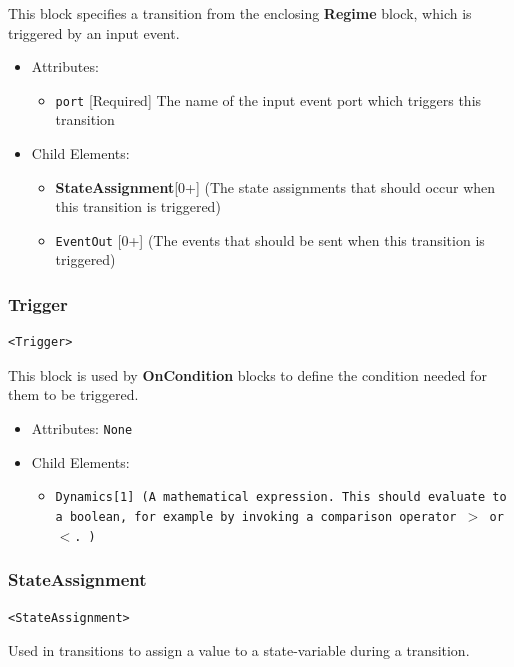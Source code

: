 \documentclass{article}
\newcommand{\MathInline}{\tt{Dynamics}}
\newcommand{\StateAssignment}{{\bf{StateAssignment}}\xspace}
\newcommand{\Regime}{{\bf{Regime}}\xspace}
\newcommand{\OnCondition}{{\bf{OnCondition}}\xspace}
\begin{document}
This block specifies a transition from the enclosing \Regime block, which is triggered
by an input event.

\begin{itemize}
\item Attributes:
%
\begin{itemize}
\item \verb|port| {[}Required{]} The name of the input event port which triggers this
transition
\end{itemize}

\item Child Elements:
%
\begin{itemize}
\item \StateAssignment {[}0+{]} (The state assignments that should occur when this
transition is triggered)
\item {\tt EventOut} {[}0+{]} (The events that should be sent when this transition is triggered)
\end{itemize}
\end{itemize}

\subsubsection{Trigger}
%
\begin{lstlisting}
<Trigger>
\end{lstlisting}

This block is used by \OnCondition blocks to define the condition needed for them to be triggered. 

\begin{itemize}
\item Attributes: \texttt{None}

\item Child Elements:
%
\begin{itemize}
\item \MathInline {[}1{]} (A mathematical expression. This should evaluate to a
boolean, for example by invoking a comparison operator  $>$ or $<$. )
\end{itemize}
\end{itemize}

\subsubsection{StateAssignment}
%
\begin{lstlisting}
<StateAssignment>
\end{lstlisting}

Used in transitions to assign a value to a state-variable during a transition.
\end{document}

